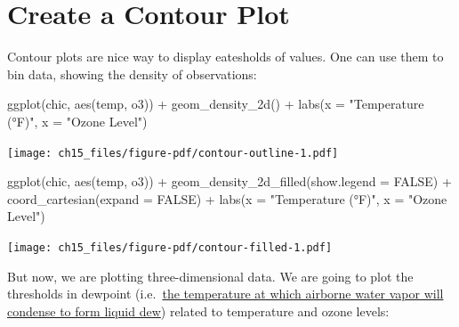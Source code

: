 \documentclass[
  letterpaper,
  DIV=11,
  numbers=noendperiod]{scrreprt}
\newenvironment{Shaded}{\begin{snugshade}}{\end{snugshade}}
\newcommand{\AttributeTok}[1]{\textcolor[rgb]{0.40,0.45,0.13}{#1}}
\newcommand{\ConstantTok}[1]{\textcolor[rgb]{0.56,0.35,0.01}{#1}}
\newcommand{\FunctionTok}[1]{\textcolor[rgb]{0.28,0.35,0.67}{#1}}
\newcommand{\NormalTok}[1]{\textcolor[rgb]{0.00,0.23,0.31}{#1}}
\newcommand{\SpecialCharTok}[1]{\textcolor[rgb]{0.37,0.37,0.37}{#1}}
\newcommand{\StringTok}[1]{\textcolor[rgb]{0.13,0.47,0.30}{#1}}
\begin{document}
\section{Create a Contour Plot}\label{create-a-contour-plot}

Contour plots are nice way to display eatesholds of values. One can use
them to bin data, showing the density of observations:

\begin{Shaded}
\begin{Highlighting}[]
\FunctionTok{ggplot}\NormalTok{(chic, }\FunctionTok{aes}\NormalTok{(temp, o3)) }\SpecialCharTok{+}
  \FunctionTok{geom\_density\_2d}\NormalTok{() }\SpecialCharTok{+}
  \FunctionTok{labs}\NormalTok{(}\AttributeTok{x =} \StringTok{"Temperature (°F)"}\NormalTok{, }\AttributeTok{x =} \StringTok{"Ozone Level"}\NormalTok{)}
\end{Highlighting}
\end{Shaded}

\texttt{[image: ch15\_files/figure-pdf/contour-outline-1.pdf]}

\begin{Shaded}
\begin{Highlighting}[]
\FunctionTok{ggplot}\NormalTok{(chic, }\FunctionTok{aes}\NormalTok{(temp, o3)) }\SpecialCharTok{+}
  \FunctionTok{geom\_density\_2d\_filled}\NormalTok{(}\AttributeTok{show.legend =} \ConstantTok{FALSE}\NormalTok{) }\SpecialCharTok{+}
  \FunctionTok{coord\_cartesian}\NormalTok{(}\AttributeTok{expand =} \ConstantTok{FALSE}\NormalTok{) }\SpecialCharTok{+}
  \FunctionTok{labs}\NormalTok{(}\AttributeTok{x =} \StringTok{"Temperature (°F)"}\NormalTok{, }\AttributeTok{x =} \StringTok{"Ozone Level"}\NormalTok{)}
\end{Highlighting}
\end{Shaded}

\texttt{[image: ch15\_files/figure-pdf/contour-filled-1.pdf]}

But now, we are plotting three-dimensional data. We are going to plot
the thresholds in dewpoint
(i.e.~\href{https://en.wikipedia.org/wiki/Dew_point}{the temperature at
which airborne water vapor will condense to form liquid dew}) related to
temperature and ozone levels:
\end{document}
